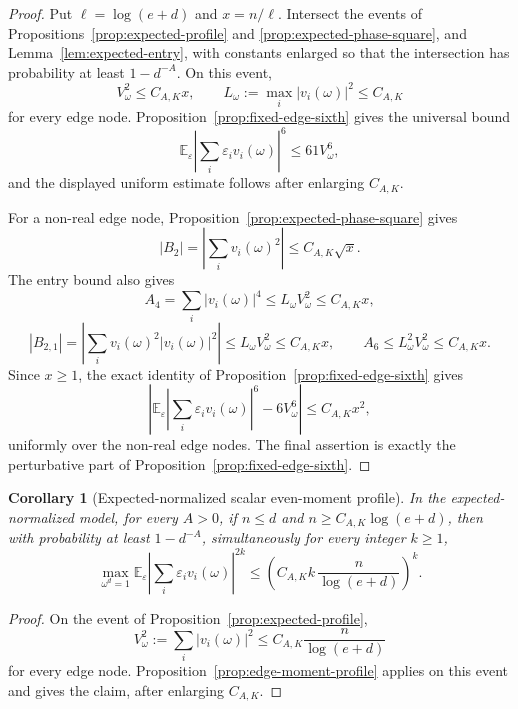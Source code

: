 \documentclass[11pt]{amsart}
\numberwithin{equation}{section}
\newtheorem{corollary}[theorem]{Corollary}
\theoremstyle{definition}
\theoremstyle{remark}
\newcommand{\Exp}{\mathbb E}
\newcommand{\eps}{\varepsilon}
\begin{document}
\begin{proof}
Put \(\ell=\log(e+d)\) and \(x=n/\ell\).  Intersect the events of
Propositions~\ref{prop:expected-profile} and
\ref{prop:expected-phase-square}, and Lemma~\ref{lem:expected-entry}, with
constants enlarged so that the intersection has probability at least
\(1-d^{-A}\).  On this event,
\[
  V_\omega^2\le C_{A,K}x,\qquad
  L_\omega:=\max_i|v_i(\omega)|^2\le C_{A,K}
\]
for every edge node.  Proposition~\ref{prop:fixed-edge-sixth} gives the
universal bound
\[
  \Exp_\eps\left|\sum_i\eps_i v_i(\omega)\right|^6\le 61V_\omega^6,
\]
and the displayed uniform estimate follows after enlarging \(C_{A,K}\).

For a non-real edge node, Proposition~\ref{prop:expected-phase-square} gives
\[
  |B_2|=\left|\sum_i v_i(\omega)^2\right|\le C_{A,K}\sqrt x.
\]
The entry bound also gives
\[
  A_4=\sum_i|v_i(\omega)|^4\le L_\omega V_\omega^2\le C_{A,K}x,
\]
\[
  |B_{2,1}|=\left|\sum_i v_i(\omega)^2|v_i(\omega)|^2\right|
  \le L_\omega V_\omega^2\le C_{A,K}x,
  \qquad
  A_6\le L_\omega^2V_\omega^2\le C_{A,K}x.
\]
Since \(x\ge1\), the exact identity of
Proposition~\ref{prop:fixed-edge-sixth} gives
\[
  \left|\Exp_\eps\left|\sum_i\eps_i v_i(\omega)\right|^6-6V_\omega^6\right|
  \le C_{A,K}x^2,
\]
uniformly over the non-real edge nodes.  The final assertion is exactly the
perturbative part of
Proposition~\ref{prop:fixed-edge-sixth}.
\end{proof}

\begin{corollary}[Expected-normalized scalar even-moment profile]
\label{cor:expected-even-profile}
In the expected-normalized model, for every \(A>0\), if \(n\le d\) and
\(n\ge C_{A,K}\log(e+d)\), then with probability at least \(1-d^{-A}\),
simultaneously for every integer \(k\ge1\),
\[
  \max_{\omega^d=1}
  \Exp_\eps\left|\sum_i\eps_i v_i(\omega)\right|^{2k}
  \le
  \left(C_{A,K}k\,\frac{n}{\log(e+d)}\right)^k .
\]
\end{corollary}

\begin{proof}
On the event of Proposition~\ref{prop:expected-profile},
\[
  V_\omega^2:=\sum_i|v_i(\omega)|^2
  \le C_{A,K}\frac n{\log(e+d)}
\]
for every edge node.  Proposition~\ref{prop:edge-moment-profile} applies on
this event and gives the claim, after enlarging \(C_{A,K}\).
\end{proof}
\end{document}
